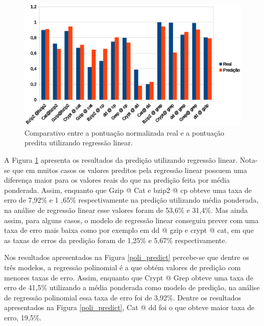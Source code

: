 \begin{figure}[!htb]
\centering
\includegraphics [keepaspectratio=true,scale=0.5]{graficos/linear.eps}
\caption{Comparativo entre a pontuação normalizada real e a pontuação predita utilizando regressão linear.}
\label{linear_predict}
\end{figure}   

A Figura \ref{linear_predict} apresenta os resultados da predição utilizando
regressão linear. Nota-se que em muitos casos os valores preditos pela
regressão linear possuem uma diferença maior para os valores reais do que na
predição feita por média ponderada. Assim, enquanto que Gzip @ Cat e bzip2 @ cp
obteve uma taxa de erro de 7,92\% e 1 ,65\% respectivamente na predição
utilizando média ponderada, na análise de regressão linear esse valores foram
de 53,6\% e 31,4\%. Mas ainda assim, para alguns casos, o modelo de regressão
linear conseguiu prever com uma taxa de erro mais baixa como por exemplo em dd
@ gzip e crypt @ cat, em que as taxas de erros da predição foram de 1,25\% e
5,67\% respectivamente.

Nos resultados apresentados na Figura \ref{poli_predict} percebe-se que dentre
os três modelos, a regressão polinomial é a que obtém valores de predição com
menores taxas de erro. Assim, enquanto que Crypt @ Grep obteve uma taxa de erro
de 41,5\% utilizando a média ponderada como modelo de predição, na análise de
regressão polinomial essa taxa de erro foi de 3,92\%. Dentre os resultados
apresentados na Figura \ref{poli_predict}, Cat @ dd foi o que obteve maior taxa
de erro, 19,5\%. 

